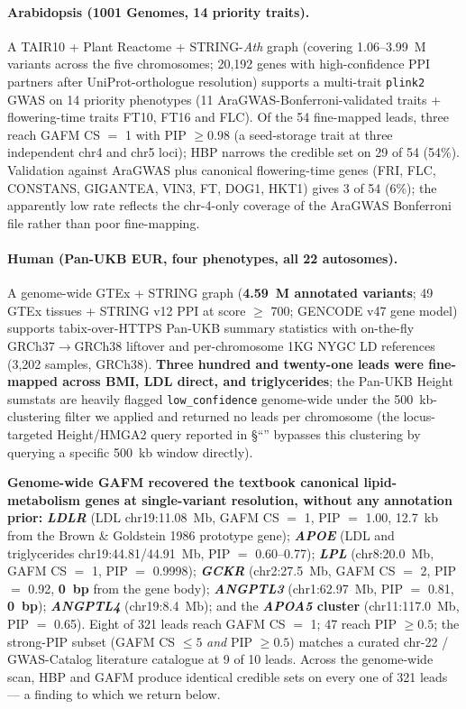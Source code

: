 \paragraph{Arabidopsis (1001 Genomes, 14 priority traits).}
A TAIR10 + Plant Reactome + STRING-\emph{Ath} graph (covering
1.06--3.99~M variants across the five chromosomes; 20{,}192 genes
with high-confidence PPI partners after UniProt-orthologue
resolution) supports a multi-trait \texttt{plink2} GWAS on 14
priority phenotypes (11 AraGWAS-Bonferroni-validated traits +
flowering-time traits FT10, FT16 and FLC). Of the 54 fine-mapped
leads, three reach GAFM CS $=$ 1 with PIP $\geq 0.98$ (a seed-storage
trait at three independent chr4 and chr5 loci); HBP narrows the
credible set on 29 of 54 (54\%). Validation against AraGWAS plus
canonical flowering-time genes (FRI, FLC, CONSTANS, GIGANTEA, VIN3,
FT, DOG1, HKT1) gives 3 of 54 (6\%); the apparently low rate
reflects the chr-4-only coverage of the AraGWAS Bonferroni file
rather than poor fine-mapping.

\paragraph{Human (Pan-UKB EUR, four phenotypes, all 22 autosomes).}
A genome-wide GTEx + STRING graph (\textbf{4.59~M annotated
variants}; 49 GTEx tissues + STRING v12 PPI at score $\geq$ 700;
GENCODE v47 gene model) supports tabix-over-HTTPS Pan-UKB summary
statistics with on-the-fly GRCh37$\to$GRCh38 liftover and per-chromosome
1KG NYGC LD references (3{,}202 samples, GRCh38). \textbf{Three
hundred and twenty-one leads were fine-mapped across BMI, LDL
direct, and triglycerides}; the Pan-UKB Height sumstats are heavily
flagged \texttt{low\_confidence} genome-wide under the
500~kb-clustering filter we applied and returned no leads per
chromosome (the locus-targeted Height/HMGA2 query reported in
\S``'' bypasses this clustering by querying a specific
500~kb window directly).

\textbf{Genome-wide GAFM recovered the textbook canonical
lipid-metabolism genes at single-variant resolution, without any
annotation prior:} \textbf{\emph{LDLR}} (LDL chr19:11.08~Mb, GAFM
CS $=$ 1, PIP $=$ 1.00, 12.7~kb from the Brown \& Goldstein 1986
prototype gene); \textbf{\emph{APOE}} (LDL and triglycerides
chr19:44.81/44.91~Mb, PIP $=$ 0.60--0.77);
\textbf{\emph{LPL}} (chr8:20.0~Mb, GAFM CS $=$ 1, PIP $=$ 0.9998);
\textbf{\emph{GCKR}} (chr2:27.5~Mb, GAFM CS $=$ 2, PIP $=$ 0.92,
\textbf{0~bp} from the gene body); \textbf{\emph{ANGPTL3}}
(chr1:62.97~Mb, PIP $=$ 0.81, \textbf{0~bp});
\textbf{\emph{ANGPTL4}} (chr19:8.4~Mb); and the
\textbf{\emph{APOA5} cluster} (chr11:117.0~Mb, PIP $=$ 0.65). Eight of
321 leads reach GAFM CS $=$ 1; 47 reach PIP $\geq 0.5$;
the strong-PIP subset (GAFM CS $\leq 5$ \emph{and} PIP $\geq 0.5$)
matches a curated chr-22 / GWAS-Catalog literature catalogue at 9 of
10 leads. Across the genome-wide scan, HBP and GAFM produce identical
credible sets on every one of 321 leads --- a finding to which we
return below.

